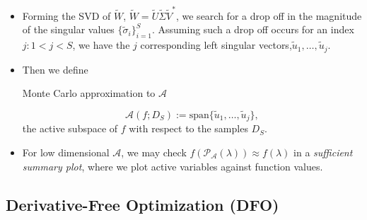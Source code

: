 \documentclass[11pt]{beamer}
\newcommand{\A}{\mathcal{A}}
\begin{document}
\begin{frame}

\begin{itemize}

	\item Forming the SVD of $\tilde{W}$, $\tilde{W}=\tilde{U}\tilde{\Sigma}\tilde{V}^*$, we search for a drop off in the magnitude of the singular values $\{\tilde{\sigma}_i\}_{i=1}^S$. Assuming such a drop off occurs for an index $j:1<j<S$, we have the $j$ corresponding left singular vectors,$ \tilde{u}_1,\ldots,\tilde{u}_{j}$.  
	
	\item Then we define

	\begin{block}{Monte Carlo approximation to $\A$}
	
	
	$$\A\left(f; D_S \right):=\text{span}\{\tilde{u}_1,\ldots,\tilde{u}_{j}\},$$ the active subspace of $f$ with respect to the samples $D_S$.
	
	\end{block}		

	\item For low dimensional $\A$, we may check $f(\mathcal{P}_\A(\lambda))\approx f(\lambda)$ in a \emph{sufficient summary plot}, where we plot active variables against function values.


\end{itemize}


\end{frame}

\subsection{Derivative-Free Optimization (DFO)}
\end{document}
